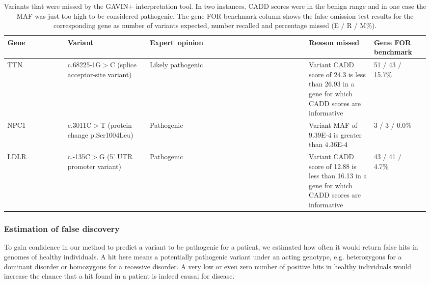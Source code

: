 \begin{table}
\begin{tabulary}{\linewidth}{LLLLLL}
  \mbox{Gene~~~~~~~~~} & \mbox{Variant~~~~~~~~~~~} & \mbox{Expert opinion~~~~~~~~~~~~~~~~~~~~~~~~~} & Reason missed & Gene FOR benchmark \\
  \hline
  \rule{0pt}{2.5ex}TTN & c.68225-1G$>$C (splice acceptor-site variant) & Likely pathogenic & Variant CADD score of 24.3 is less than 26.93 in a gene for which CADD scores are informative & 51 / 43 / 15.7\% \\
  \rule{0pt}{2.5ex}NPC1 & c.3011C$>$T (protein change p.Ser1004Leu) & Pathogenic & Variant MAF of 9.39E-4 is greater than 4.36E-4 & 3 / 3 / 0.0\% \\
  \rule{0pt}{2.5ex}LDLR & c.-135C$>$G (5' UTR promoter variant) & Pathogenic & Variant CADD score of 12.88 is less than 16.13 in a gene for which CADD scores are informative & 43 / 41 / 4.7\% \\
  \hline
\end{tabulary}
\caption[Variants that were missed by the GAVIN+]{Variants that were missed by the GAVIN+ interpretation tool. In two instances, CADD scores were in the benign range and in one case the MAF was just too high to be considered pathogenic. The gene FOR benchmark column shows the false omission test results for the corresponding gene as number of variants expected, number recalled and percentage missed (E / R / M\%).}
\label{table:frameworkforgenomics_missedpatientvariants}
\end{table}

\subsubsection{Estimation of false discovery}

To gain confidence in our method to predict a variant to be pathogenic for a patient, we estimated how often it would return false hits in genomes of healthy individuals.
A hit here means a potentially pathogenic variant under an acting genotype, e.g. heterozygous for a dominant disorder or homozygous for a recessive disorder.
A very low or even zero number of positive hits in healthy individuals would increase the chance that a hit found in a patient is indeed causal for disease.\\

